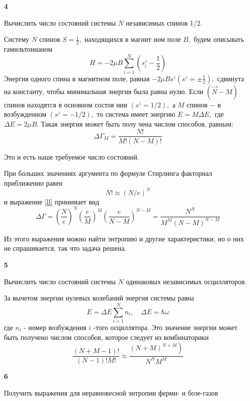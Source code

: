 \documentclass[a4paper,12pt]{article} %
\begin{document}
\begin{task}\textbf{4}

Вычислить число состояний системы $ N $ независимых спинов 1/2.


Систему $N$ спинов $S=\frac{1}{2},$ находящихся в магнит ном поле $B,$ будем описывать гамильтонианом
$$
H=-2 \mu B \sum_{i=1}^{N}\left(s_{i}^{z}-\frac{1}{2}\right)
$$
Энергия одного спина в магнитном поле, равная $-2 \mu B s^{z}\left(s^{z}=\pm \frac{1}{2}\right),$ сдвинута на константу, чтобы минимальная энергия была равна нулю. 
Если $(\vec{N}-M)$ спинов находятся в основном состоя нии $\left(s^{z}=1 / 2\right),$ а $M$ спинов $-$ в возбужденном $(s^{z}=-1 / 2),$ то система имеет энергию $E=M \Delta E,$ где $\Delta E=2 \mu B .$ 
Такая энергия может быть полу чена числом способов, равным:
\begin{equation}\label{ll}
\Delta \Gamma_{M}=\frac{N !}{M !(N-M) !}
\end{equation}

Это и есть наше требуемое число состояний.

При больших значениях аргумента по формуле Стирлинга факториал приближенно равен
$$
N ! \approx(N / e)^{N}
$$
и выражение \ref{ll} принимает вид
$$
\Delta \Gamma=\left(\frac{N}{e}\right)^{N}\left(\frac{e}{M}\right)^{M}\left(\frac{e}{N-M}\right)^{N-M}=\frac{N^{N}}{M^{M}(N-M)^{N-M}}
$$

Из этого выражения можно найти энтропию и другие характеристики, но о них не спрашивается, так что задача решена.


\end{task}


\begin{task}\textbf{5}

Вычислить число состояний системы $ N $ одинаковых независимых осцилляторов.


За вычетом энергии нулевых колебаний энергия системы равна
$$
E=\Delta E \sum_{i=1}^{N} n_{i}, \quad \Delta E=\hbar \omega
$$
где $n_{i}$ - номер возбуждения $i$ -того осциллятора. Это значение энергии может быть получено числом способов, которое следует из комбинаторики
$$
\frac{(N+M-1) !}{(N-1) ! M !} \approx \frac{\left.(N+M)^{N+M}\right)}{N^{N} M^{M}}
$$




\end{task}


\begin{task}\textbf{6}

Получить выражения для неравновесной энтропии ферми- и бозе-газов





\end{task}
\end{document}
